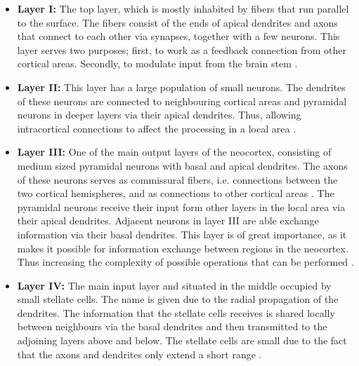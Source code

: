 \begin{itemize}[leftmargin=4em,align=left]
    \item \textbf{Layer I:} The top layer, which is mostly inhabited by fibers that run parallel to the surface. The fibers consist of the ends of apical dendrites and axons that connect to each other via synapses, together with a few neurons. This layer serves two purposes; first, to work as a feedback connection from other cortical areas. Secondly, to modulate input from the brain stem \cite{Neocortex}.
    
    \item\textbf{Layer II:} This layer has a large population of small neurons. The dendrites of these neurons are connected to neighbouring cortical areas and pyramidal neurons in deeper layers via their apical dendrites. Thus, allowing intracortical connections to affect the processing in a local area \cite{Neocortex}.
    
    \item\textbf{Layer III:} One of the main output layers of the neocortex, consisting of medium sized pyramidal neurons with basal and apical dendrites. The axons of these neurons serves as commissural fibers, i.e. connections between the two cortical hemispheres, and as connections to other cortical areas \cite{crossman2014neuroanatomy}. The pyramidal neurons receive their input form other layers in the local area via their apical dendrites. Adjacent neurons in layer III are able exchange information via their basal dendrites. This layer is of great importance, as it makes it possible for information exchange between regions in the neocortex. Thus increasing the complexity of possible operations that can be performed \cite{Neocortex}.
    
    \item\textbf{Layer IV:} The main input layer and situated in the middle occupied by small stellate cells. The name is given due to the radial propagation of the dendrites. The information that the stellate cells receives is shared locally between neighbours via the basal dendrites and then transmitted to the adjoining layers above and below. The stellate cells are small due to the fact that the axons and dendrites only extend a short range \cite{Neocortex}.
    

\end{itemize}
